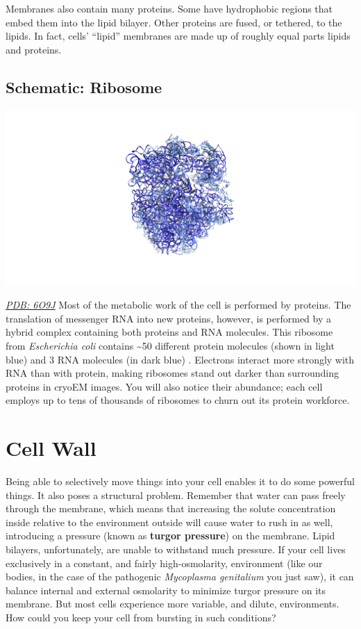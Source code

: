 \documentclass[]{tufte-book}
\begin{document}
Membranes also contain many proteins. Some have hydrophobic regions that embed them into the lipid bilayer. Other proteins are fused, or tethered, to the lipids. In fact, cells' ``lipid'' membranes are made up of roughly equal parts lipids and proteins.

\hypertarget{Ribosome}{%
\subsection*{Schematic: Ribosome}\label{Ribosome}}

\includegraphics{img/schematics/2_1_2}

\href{http://rcsb.org/structure/6O9J}{\emph{PDB: 6O9J}}
Most of the metabolic work of the cell is performed by proteins. The translation of messenger RNA into new proteins, however, is performed by a hybrid complex containing both proteins and RNA molecules. This ribosome from \emph{Escherichia coli} contains \textasciitilde{}50 different protein molecules (shown in light blue) and 3 RNA molecules (in dark blue) \citep{kaledhonkar2019}. Electrons interact more strongly with RNA than with protein, making ribosomes stand out darker than surrounding proteins in cryoEM images. You will also notice their abundance; each cell employs up to tens of thousands of ribosomes to churn out its protein workforce.

\hypertarget{cell-wall}{%
\section{Cell Wall}\label{cell-wall}}

Being able to selectively move things into your cell enables it to do some powerful things. It also poses a structural problem. Remember that water can pass freely through the membrane, which means that increasing the solute concentration inside relative to the environment outside will cause water to rush in as well, introducing a pressure (known as \textbf{turgor pressure}) on the membrane. Lipid bilayers, unfortunately, are unable to withstand much pressure. If your cell lives exclusively in a constant, and fairly high-osmolarity, environment (like our bodies, in the case of the pathogenic \emph{Mycoplasma genitalium} you just saw), it can balance internal and external osmolarity to minimize turgor pressure on its membrane. But most cells experience more variable, and dilute, environments. How could you keep your cell from bursting in such conditions?
\end{document}
